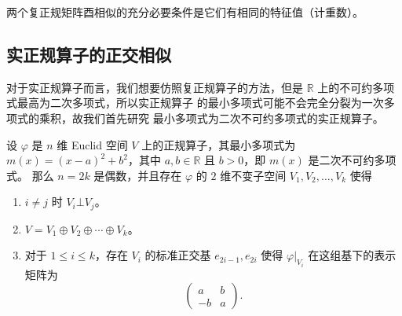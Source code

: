 \documentclass[fontset=none,zihao=-4]{Notes}
\begin{document}
\begin{corollary}
  两个复正规矩阵酉相似的充分必要条件是它们有相同的特征值（计重数）。
\end{corollary}

\subsection{实正规算子的正交相似}

对于实正规算子而言，我们想要仿照复正规算子的方法，但是
$\mathbb{R}$ 上的不可约多项式最高为二次多项式，所以实正规算子
的最小多项式可能不会完全分裂为一次多项式的乘积，故我们首先研究
最小多项式为二次不可约多项式的实正规算子。

\begin{theorem}\label{thm:degree two real normal operator}
  设 $\varphi$ 是 $n$ 维 Euclid 空间 $V$ 上的正规算子，其最小多项式为
  $m(x)=(x-a)^2+b^2$，其中 $a,b\in\mathbb{R}$ 且 $b>0$，即
  $m(x)$ 是二次不可约多项式。
  那么 $n=2k$ 是偶数，并且存在 $\varphi$ 的 $2$ 维不变子空间
  $V_1,V_2,\dots,V_k$ 使得
  \begin{enumerate}
    \item $i\neq j$ 时 $V_i\bot V_j$。
    \item $V=V_1\oplus V_2\oplus\cdots\oplus V_k$。
    \item 对于 $1\leq i\leq k$，存在 $V_i$ 的标准正交基 $e_{2i-1},e_{2i}$
    使得 $\varphi|_{V_i}$ 在这组基下的表示矩阵为
    \[
      \begin{pmatrix}
        a & b\\
        -b & a
      \end{pmatrix}  .
    \]
  \end{enumerate}
\end{theorem}
\end{document}
